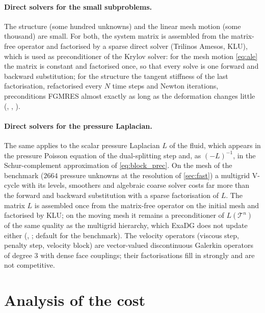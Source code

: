 \documentclass[11pt,a4paper]{article}
\theoremstyle{definition}
\theoremstyle{remark}
\begin{document}
\paragraph{Direct solvers for the small subproblems.} The structure (some hundred unknowns) and the
linear mesh motion (some thousand) are small. For both, the system matrix is assembled from the
matrix-free operator and factorised by a sparse direct solver (Trilinos Amesos, KLU), which is used
as preconditioner of the Krylov solver: for the mesh motion \eqref{eq:ale} the matrix is constant and
factorised once, so that every solve is one forward and backward substitution; for the structure
the tangent stiffness of the last factorisation, refactorised every $N$ time steps and Newton
iterations, preconditions FGMRES almost exactly as long as the deformation changes little
(, ,
).

\paragraph{Direct solvers for the pressure Laplacian.} The same applies to the scalar pressure
Laplacian $L$ of the fluid, which appears in the pressure Poisson equation of the dual-splitting
step and, as $(-L)^{-1}$, in the Schur-complement approximation of \eqref{eq:block_prec}. On the
mesh of the benchmark ($2664$ pressure unknowns at the resolution of \cref{sec:fast}) a multigrid
V-cycle with its levels, smoothers and algebraic coarse solver costs far more than the forward and
backward substitution with a sparse factorisation of $L$. The matrix $L$ is assembled once from the
matrix-free operator on the initial mesh and factorised by KLU; on the moving mesh it remains a
preconditioner of $L(\mathcal T^{n})$ of the same quality as the multigrid hierarchy, which ExaDG
does not update either (,
; default for the benchmark). The velocity operators (viscous step,
penalty step, velocity block) are vector-valued discontinuous Galerkin operators of degree $3$ with
dense face couplings; their factorisations fill in strongly and are not competitive.

\section{Analysis of the cost}\label{sec:analysis}
\end{document}
